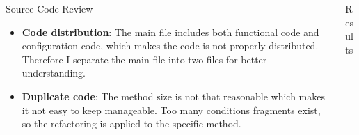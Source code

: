 \documentclass[final]{beamer}
\newlength{\onecolwid}
\newlength{\twocolwid}
\begin{document}
\begin{frame}[t]
\begin{columns}[t]
\begin{column}{\twocolwid}

\begin{columns}[t,totalwidth=\twocolwid] %

\begin{column}{\onecolwid} %


\begin{block}{Source Code Review}

\begin{itemize}
\setlength{\itemsep}{20pt}
\item \textbf{Code distribution}: The main file includes both functional code and configuration code, which makes the code is not properly distributed. Therefore I separate the main file into two files for better understanding.
\setlength{\itemsep}{60pt}
\item \textbf{Duplicate code}: The method size is not that reasonable which makes it not easy to keep manageable. Too many conditions fragments exist, so the refactoring is applied to the specific method.

\end{itemize}

\end{block}


\end{column} %

\begin{column}{\onecolwid} %


\begin{block}{Results}


\end{block}
\end{column}
\end{columns}
\end{column}
\end{columns}
\end{frame}
\end{document}

